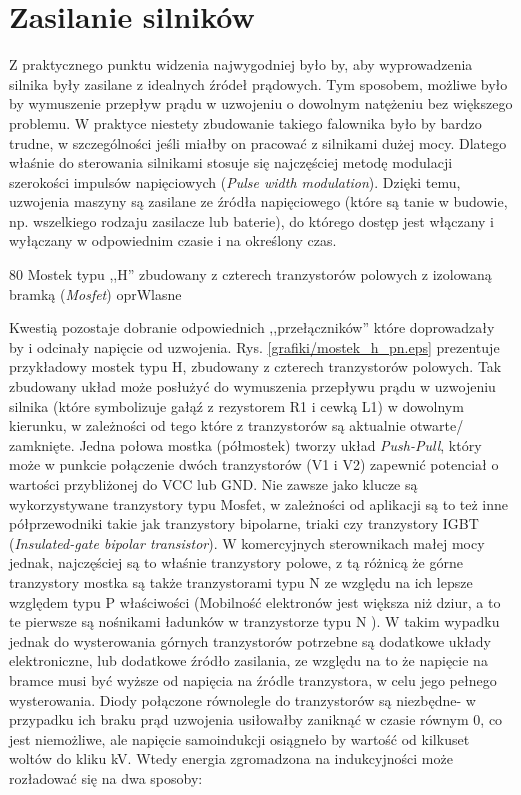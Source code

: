 \section{Zasilanie silników}

Z praktycznego punktu widzenia najwygodniej było by, aby wyprowadzenia silnika były zasilane z idealnych źródeł prądowych. Tym sposobem, możliwe było by wymuszenie przepływ prądu w uzwojeniu o dowolnym natężeniu bez większego problemu. W praktyce niestety zbudowanie takiego falownika było by bardzo trudne, w szczególności jeśli miałby on pracować z silnikami dużej mocy. Dlatego właśnie do sterowania silnikami stosuje się najczęściej metodę modulacji szerokości impulsów napięciowych ({\it Pulse width modulation}). Dzięki temu, uzwojenia maszyny są zasilane ze źródła napięciowego (które są tanie w budowie, np. wszelkiego rodzaju zasilacze lub baterie), do którego dostęp jest włączany i wyłączany w odpowiednim czasie i na określony czas.

	{80}
	{Mostek typu ,,H'' zbudowany z czterech tranzystorów polowych z izolowaną bramką ({\it Mosfet})}
	{oprWlasne}

Kwestią pozostaje dobranie odpowiednich ,,przełączników'' które doprowadzały by i odcinały napięcie od uzwojenia. Rys. \ref{grafiki/mostek_h_pn.eps} prezentuje przykładowy mostek typu H, zbudowany z czterech tranzystorów polowych. Tak zbudowany układ może posłużyć do wymuszenia przepływu prądu w uzwojeniu silnika (które symbolizuje gałąź z rezystorem R1 i cewką L1) w dowolnym kierunku, w zależności od tego które z tranzystorów są aktualnie otwarte/ zamknięte. Jedna połowa mostka (półmostek) tworzy układ {\it Push-Pull}, który może w punkcie połączenie dwóch tranzystorów (V1 i V2) zapewnić potenciał o wartości przybliżonej do VCC lub GND. Nie zawsze jako klucze są wykorzystywane tranzystory typu Mosfet, w zależności od aplikacji są to też inne półprzewodniki takie jak tranzystory bipolarne, triaki czy tranzystory IGBT ({\it Insulated-gate bipolar transistor}). W komercyjnych sterownikach małej mocy jednak, najczęściej są to właśnie tranzystory polowe, z tą różnicą że górne tranzystory mostka są także tranzystorami typu N ze względu na ich lepsze względem typu P właściwości (Mobilność elektronów jest większa niż dziur, a to te pierwsze są nośnikami ładunków w tranzystorze typu N \cite{tietze}). W takim wypadku jednak do wysterowania górnych tranzystorów potrzebne są dodatkowe układy elektroniczne, lub dodatkowe źródło zasilania, ze względu na to że napięcie na bramce musi być wyższe od napięcia na źródle tranzystora, w celu jego pełnego wysterowania. Diody połączone równolegle do tranzystorów są niezbędne- w przypadku ich braku prąd uzwojenia usiłowałby zaniknąć w czasie równym 0, co jest niemożliwe, ale napięcie samoindukcji osiągneło by wartość od kilkuset woltów do kliku kV. Wtedy energia zgromadzona na indukcyjności może rozładować się na dwa sposoby: 

